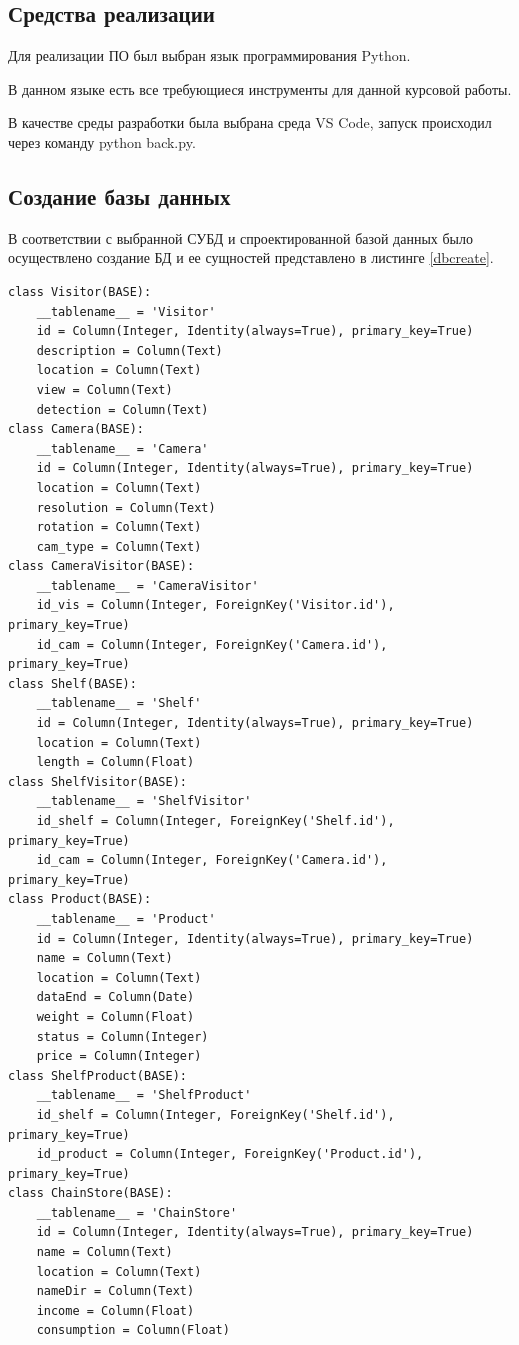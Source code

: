 \subsection{Средства реализации}

Для реализации ПО был выбран язык программирования Python\cite{python}.

В данном языке есть все требующиеся инструменты для данной курсовой работы.

В качестве среды разработки была выбрана среда VS Code\cite{vscode}, запуск
происходил через команду python back.py.

\subsection{Создание базы данных}

В соответствии с выбранной СУБД и спроектированной базой данных было
осуществлено создание БД и ее сущностей представлено в листинге \ref{dbcreate}.

\begin{lstlisting}[label=dbcreate, caption=Создание БД]
class Visitor(BASE):
    __tablename__ = 'Visitor'
    id = Column(Integer, Identity(always=True), primary_key=True)
    description = Column(Text)
    location = Column(Text)
    view = Column(Text)
    detection = Column(Text)
class Camera(BASE):
    __tablename__ = 'Camera'
    id = Column(Integer, Identity(always=True), primary_key=True)
    location = Column(Text)
    resolution = Column(Text)
    rotation = Column(Text)
    cam_type = Column(Text)
class CameraVisitor(BASE):
    __tablename__ = 'CameraVisitor'
    id_vis = Column(Integer, ForeignKey('Visitor.id'), primary_key=True)
    id_cam = Column(Integer, ForeignKey('Camera.id'), primary_key=True)
class Shelf(BASE):
    __tablename__ = 'Shelf'
    id = Column(Integer, Identity(always=True), primary_key=True)
    location = Column(Text)
    length = Column(Float)
class ShelfVisitor(BASE):
    __tablename__ = 'ShelfVisitor'
    id_shelf = Column(Integer, ForeignKey('Shelf.id'), primary_key=True)
    id_cam = Column(Integer, ForeignKey('Camera.id'), primary_key=True)
class Product(BASE):
    __tablename__ = 'Product'
    id = Column(Integer, Identity(always=True), primary_key=True)
    name = Column(Text)
    location = Column(Text)
    dataEnd = Column(Date)
    weight = Column(Float)
    status = Column(Integer)
    price = Column(Integer)
class ShelfProduct(BASE):
    __tablename__ = 'ShelfProduct'
    id_shelf = Column(Integer, ForeignKey('Shelf.id'), primary_key=True)
    id_product = Column(Integer, ForeignKey('Product.id'), primary_key=True)
class ChainStore(BASE):
    __tablename__ = 'ChainStore'
    id = Column(Integer, Identity(always=True), primary_key=True)
    name = Column(Text)
    location = Column(Text)
    nameDir = Column(Text)
    income = Column(Float)
    consumption = Column(Float)
\end{lstlisting}


